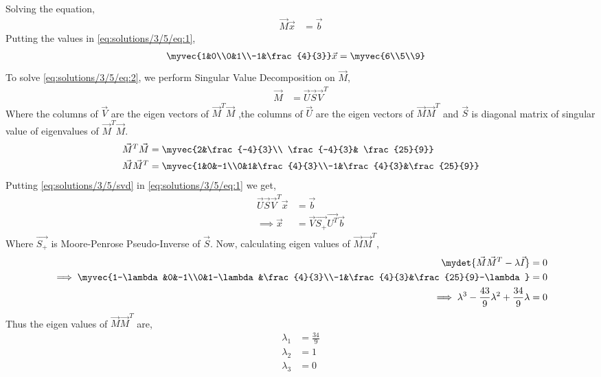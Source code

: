 Solving the equation, 
\begin{align} \label{eq:solutions/3/5/eq:1}
    \vec{M}\vec{x}&=\vec{b}
\end{align}
Putting the values in \eqref{eq:solutions/3/5/eq:1}, 
\begin{align} \label{eq:solutions/3/5/eq:2}
    \myvec{1&0\\0&1\\-1&\frac{4}{3}}\vec{x}&= \myvec{6\\5\\9}
\end{align}
To solve \eqref{eq:solutions/3/5/eq:2}, we perform Singular Value Decomposition on $\vec{M}$, 
\begin{align} \label{eq:solutions/3/5/svd}
    \vec{M}&=\vec{U}\vec{S}\vec{V}^T
\end{align}
Where the columns of $\vec{V}$ are the eigen vectors of $\vec{M}^T\vec{M}$ ,the columns of $\vec{U}$ are the eigen vectors of $\vec{M}\vec{M}^T$ and $\vec{S}$ is diagonal matrix of singular value of eigenvalues of $\vec{M}^T\vec{M}$.
\begin{align}
    \vec{M}^T\vec{M}&=\myvec{2&\frac{-4}{3}\\ \frac{-4}{3}& \frac{25}{9}} \label{eq:solutions/3/5/MTM}\\
    \vec{M}\vec{M}^T&=\myvec{1&0&-1\\0&1&\frac{4}{3}\\-1&\frac{4}{3}&\frac{25}{9}} \label{eq:solutions/3/5/MMT}
\end{align}
Putting \eqref{eq:solutions/3/5/svd} in \eqref{eq:solutions/3/5/eq:1} we get, 
\begin{align}
    \vec{U}\vec{S}\vec{V}^T\vec{x}&= \vec{b}\\
    \implies\vec{x} &= \vec{V}\vec{S_+}\vec{U^T}\vec{b}\label{eq:solutions/3/5/eq:X}
\end{align}
Where $\vec{S_+}$ is Moore-Penrose Pseudo-Inverse of $\vec{S}$. Now, calculating eigen values of $\vec{M}\vec{M}^T$,
\begin{align}
\mydet{\vec{M}\vec{M}^T - \lambda\vec{I}} &= 0\\
\implies\myvec{1-\lambda&0&-1\\0&1-\lambda&\frac{4}{3}\\-1&\frac{4}{3}&\frac{25}{9}-\lambda} &=0\\
\implies\lambda^3-\frac{43}{9}\lambda^2+\frac{34}{9}\lambda &=0
\end{align}
Thus the eigen values of $\vec{M}\vec{M}^T$ are, 
\begin{align}
    \lambda_1 &= \frac{34}{9}\\
    \lambda_2 &= 1 \\
    \lambda_3 &= 0
\end{align}
